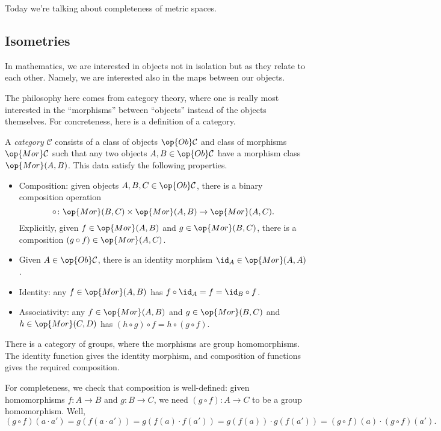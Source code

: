 \documentclass[../notes.tex]{subfiles}
\begin{document}
Today we're talking about completeness of metric spaces.

\subsection{Isometries}
In mathematics, we are interested in objects not in isolation but as they relate to each other. Namely, we are interested also in the maps between our objects.

The philosophy here comes from category theory, where one is really most interested in the ``morphisms'' between ``objects'' instead of the objects themselves. For concreteness, here is a definition of a category.
\begin{definition}[Category]
	A \textit{category} $\mathcal C$ consists of a class of objects $\op{Ob}\mathcal C$ and class of morphisms $\op{Mor}\mathcal C$ such that any two objects $A,B\in\op{Ob}\mathcal C$ have a morphism class $\op{Mor}(A,B)$. This data satisfy the following properties.
	\begin{itemize}
		\item Composition: given objects $A,B,C\in\op{Ob}\mathcal C$, there is a binary composition operation
		\[\circ\colon\op{Mor}(B,C)\times\op{Mor}(A,B)\to\op{Mor}(A,C).\]
		Explicitly, given $f\in\op{Mor}(A,B)$ and $g\in\op{Mor}(B,C)$, there is a composition $(g\circ f)\in\op{Mor}(A,C)$.
		\item Given $A\in\op{Ob}\mathcal C$, there is an identity morphism ${\id_A}\in\op{Mor}(A,A)$.
		\item Identity: any $f\in\op{Mor}(A,B)$ has $f\circ{\id_A}=f={\id_B}\circ f$.
		\item Associativity: any $f\in\op{Mor}(A,B)$ and $g\in\op{Mor}(B,C)$ and $h\in\op{Mor}(C,D)$ has $(h\circ g)\circ f=h\circ (g\circ f)$.
	\end{itemize}
\end{definition}
\begin{example}
	There is a category of groups, where the morphisms are group homomorphisms. The identity function gives the identity morphism, and composition of functions gives the required composition.
	
	For completeness, we check that composition is well-defined: given homomorphisms $f\colon A\to B$ and $g\colon B\to C$, we need $(g\circ f)\colon A\to C$ to be a group homomorphism. Well,
	\[(g\circ f)(a\cdot a')=g(f(a\cdot a'))=g(f(a)\cdot f(a'))=g(f(a))\cdot g(f(a'))=(g\circ f)(a)\cdot (g\circ f)(a').\]
\end{example}
\end{document}
